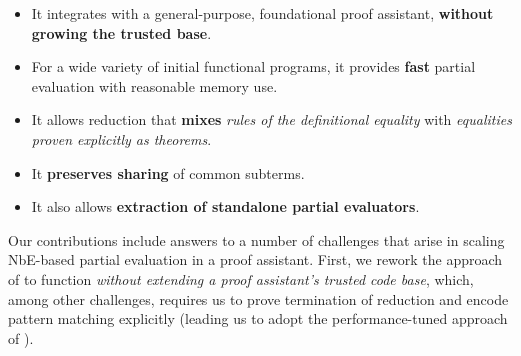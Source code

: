 \begin{itemize}
\item It integrates with a general-purpose, foundational proof assistant, \textbf{without growing the trusted base}.
\item For a wide variety of initial functional programs, it provides \textbf{fast} partial evaluation with reasonable memory use.
\item It allows reduction that \textbf{mixes} \emph{rules of the definitional equality} with \emph{equalities proven explicitly as theorems}.
\item It \textbf{preserves sharing} of common subterms.
\item It also allows \textbf{extraction of standalone partial evaluators}.
\end{itemize}

Our contributions include answers to a number of challenges that arise in scaling NbE-based partial evaluation in a proof assistant.
First, we rework the approach of \textcite{Aehlig} to function \emph{without extending a proof assistant's trusted code base}, which, among other challenges, requires us to prove termination of reduction and encode pattern matching explicitly (leading us to adopt the performance-tuned approach of \textcite{maranget2008compiling}).

